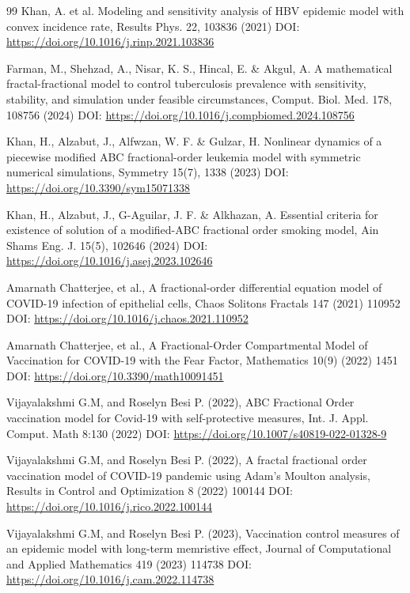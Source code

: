 \documentclass[10pt]{NSP1}
\begin{document}
\begin{thebibliography}{99}
Khan, A. et al. Modeling and sensitivity analysis of HBV epidemic model with convex incidence rate, Results Phys. 22, 103836 (2021) DOI: \url{https://doi.org/10.1016/j.rinp.2021.103836}

Farman, M., Shehzad, A., Nisar, K. S., Hincal, E. \& Akgul, A. A mathematical fractal-fractional model to control tuberculosis prevalence with sensitivity, stability, and simulation under feasible circumstances, Comput. Biol. Med. 178, 108756 (2024) DOI: \url{https://doi.org/10.1016/j.compbiomed.2024.108756}

Khan, H., Alzabut, J., Alfwzan, W. F. \& Gulzar, H. Nonlinear dynamics of a piecewise modified ABC fractional-order leukemia model with symmetric numerical simulations, Symmetry 15(7), 1338 (2023) DOI: \url{https://doi.org/10.3390/sym15071338}

Khan, H., Alzabut, J., G-Aguilar, J. F. \& Alkhazan, A. Essential criteria for existence of solution of a modified-ABC fractional order smoking model, Ain Shams Eng. J. 15(5), 102646 (2024) DOI: \url{https://doi.org/10.1016/j.asej.2023.102646}

Amarnath Chatterjee, et al., A fractional-order differential equation model of COVID-19 infection of epithelial cells, Chaos Solitons Fractals 147 (2021) 110952 DOI: \url{https://doi.org/10.1016/j.chaos.2021.110952}

Amarnath Chatterjee, et al., A Fractional-Order Compartmental Model of Vaccination for COVID-19 with the Fear Factor, Mathematics 10(9) (2022) 1451 DOI: \url{https://doi.org/10.3390/math10091451}

Vijayalakshmi G.M, and Roselyn Besi P. (2022), ABC Fractional Order vaccination model for Covid-19 with self-protective measures, Int. J. Appl. Comput. Math 8:130 (2022) DOI: \url{https://doi.org/10.1007/s40819-022-01328-9}

Vijayalakshmi G.M, and Roselyn Besi P. (2022), A fractal fractional order vaccination model of COVID-19 pandemic using Adam's Moulton analysis, Results in Control and Optimization 8 (2022) 100144 DOI: \url{https://doi.org/10.1016/j.rico.2022.100144}

Vijayalakshmi G.M, and Roselyn Besi P. (2023), Vaccination control measures of an epidemic model with long-term memristive effect, Journal of Computational and Applied Mathematics 419 (2023) 114738 DOI: \url{https://doi.org/10.1016/j.cam.2022.114738}


\end{thebibliography}
\end{document}

